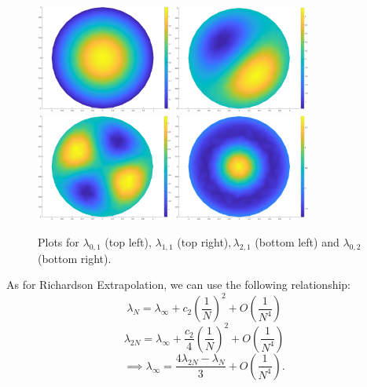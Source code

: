 \documentclass[letterpaper, reqno,11pt]{article}
\begin{document}
\begin{figure}[htpb]
  \centering
  \includegraphics[width=0.4\textwidth]{lambda01}
  \includegraphics[width=0.4\textwidth]{lambda11}
  \includegraphics[width=0.4\textwidth]{lambda21}
  \includegraphics[width=0.4\textwidth]{lambda02}
  \caption{Plots for $\lambda_{0,1}$ (top left), $\lambda_{1,1}$ (top right)$,\lambda_{2,1}$ (bottom left) and $\lambda_{0,2}$ (bottom right).}
  \label{fig:q1}
\end{figure}

As for Richardson Extrapolation, we can use the following relationship:
\[
\lambda_N=\lambda_{\infty}+c_2\left(\frac{1}{N}\right)^2+O\left(\frac{1}{N^{4}}\right)
\]
\[
  \lambda_{2N}=\lambda_{\infty}+\frac{c_2}{4}\left(\frac{1}{N}\right)^2+O\left(\frac{1}{N^{4}}\right)
\]
\[
\implies\lambda_{\infty}=\frac{4\lambda_{2N}-\lambda_N}{3}+O\left( \frac{1}{N^{4}} \right) 
.\]
\end{document}
